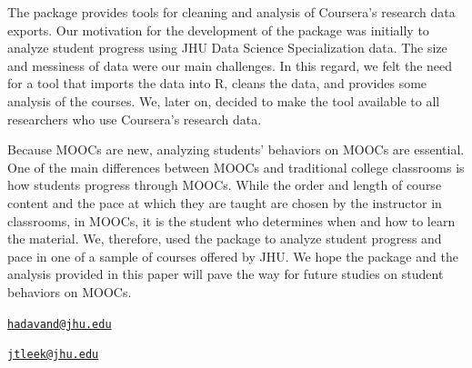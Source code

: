 The  package provides tools for cleaning and analysis of
Coursera's research data exports. Our motivation for the development of
the package was initially to analyze student progress using JHU Data
Science Specialization data. The size and messiness of data were our
main challenges. In this regard, we felt the need for a tool that
imports the data into R, cleans the data, and provides some analysis of
the courses. We, later on, decided to make the tool available to all
researchers who use Coursera's research data.

Because MOOCs are new, analyzing students' behaviors on MOOCs are
essential. One of the main differences between MOOCs and traditional
college classrooms is how students progress through MOOCs. While the
order and length of course content and the pace at which they are taught
are chosen by the instructor in classrooms, in MOOCs, it is the student
who determines when and how to learn the material. We, therefore, used
the  package to analyze student progress and pace in one of a
sample of courses offered by JHU. We hope the package and the analysis
provided in this paper will pave the way for future studies on student
behaviors on MOOCs.



\address{%
Aboozar Hadavand\\
Department of Biostatistics, Bloomberg School of Public Health, Johns
Hopkins University\\
615 N. Wolfe Street\\ Baltimore, MD 21205, USA\\
}
\href{mailto:hadavand@jhu.edu}{\nolinkurl{hadavand@jhu.edu}}

\address{%
Jeffrey Leek\\
Department of Biostatistics, Bloomberg School of Public Health, Johns
Hopkins University\\
615 N. Wolfe Street\\ Baltimore, MD 21205, USA\\
}
\href{mailto:jtleek@jhu.edu}{\nolinkurl{jtleek@jhu.edu}}

